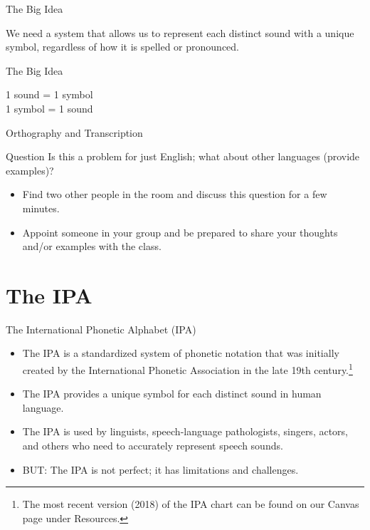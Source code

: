 \documentclass[professionalfonts]{beamer}
\begin{document}
\begin{frame}{The Big Idea}
    \begin{center}
        \huge We need a system that allows us to represent each distinct sound with a unique symbol, regardless of how it is spelled or pronounced.
    \end{center}
\end{frame}

\begin{frame}{The Big Idea}
    \begin{center}
        \huge 1 sound = 1 symbol \\
        1 symbol = 1 sound
    \end{center}
\end{frame}

\begin{frame}{Orthography and Transcription}
    \begin{block}{Question}
        Is this a problem for just English; what about other languages (provide examples)?
    \end{block}
    \begin{itemize}
        \item Find two other people in the room and discuss this question for a few minutes.
        \item Appoint someone in your group and be prepared to share your thoughts and/or examples with the class.
    \end{itemize}
\end{frame}

\section*{The IPA}
\begin{frame}{The International Phonetic Alphabet (IPA)}
    \begin{itemize}
        \item The IPA is a standardized system of phonetic notation that was initially created by the International Phonetic Association in the late 19th century.\footnote{The most recent version (2018) of the IPA chart can be found on our Canvas page under Resources.}
        \item The IPA provides a unique symbol for each distinct sound in human language.
        \item The IPA is used by linguists, speech-language pathologists, singers, actors, and others who need to accurately represent speech sounds.
        \item BUT: The IPA is not perfect; it has limitations and challenges.
    \end{itemize}
\end{frame}
\end{document}

